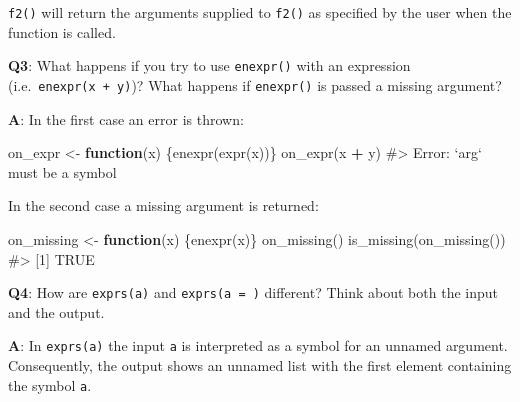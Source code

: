 \documentclass[
]{krantz}
\makeatletter
\newenvironment{Shaded}{\begin{snugshade}}{\end{snugshade}}
\newcommand{\CommentTok}[1]{\textcolor[rgb]{0.56,0.35,0.01}{\textit{#1}}}
\newcommand{\ControlFlowTok}[1]{\textcolor[rgb]{0.13,0.29,0.53}{\textbf{#1}}}
\newcommand{\KeywordTok}[1]{\textcolor[rgb]{0.13,0.29,0.53}{\textbf{#1}}}
\newcommand{\NormalTok}[1]{#1}
\newcommand{\OperatorTok}[1]{\textcolor[rgb]{0.81,0.36,0.00}{\textbf{#1}}}
\newcommand{\StringTok}[1]{\textcolor[rgb]{0.31,0.60,0.02}{#1}}
\newenvironment{kframe}{%
\medskip{}
\setlength{\fboxsep}{.8em}
 \def\at@end@of@kframe{}%
 \ifinner\ifhmode%
  \def\at@end@of@kframe{\end{minipage}}%
  \begin{minipage}{\columnwidth}%
 \fi\fi%
 \def\FrameCommand##1{\hskip\@totalleftmargin \hskip-\fboxsep
 \colorbox{shadecolor}{##1}\hskip-\fboxsep
     \hskip-\linewidth \hskip-\@totalleftmargin \hskip\columnwidth}%
 \MakeFramed {\advance\hsize-\width
   \@totalleftmargin\z@ \linewidth\hsize
   \@setminipage}}%
 {\par\unskip\endMakeFramed%
 \at@end@of@kframe}
\renewenvironment{Shaded}{\begin{kframe}}{\end{kframe}}
\renewcommand{\KeywordTok} [1]{\textcolor[rgb]{0.00,0.44,0.13}{{#1}}}
\renewcommand{\StringTok}  [1]{\textcolor[rgb]{0.25,0.44,0.63}{{#1}}}
\renewcommand{\CommentTok} [1]{\textcolor[rgb]{0.38,0.63,0.69}{{#1}}}
\renewcommand{\NormalTok}  [1]{{#1}}
\makeatother
\begin{document}
\texttt{f2()} will return the arguments supplied to \texttt{f2()} as specified by the user when the function is called.

\begin{Shaded}
\end{Shaded}

\textbf{{Q3}}: What happens if you try to use \texttt{enexpr()} with an expression (i.e.~\texttt{enexpr(x\ +\ y)})? What happens if \texttt{enexpr()} is passed a missing argument?

\textbf{{A}}: In the first case an error is thrown:

\begin{Shaded}
\begin{Highlighting}[]
\NormalTok{on_expr <-}\StringTok{ }\ControlFlowTok{function}\NormalTok{(x) \{}\KeywordTok{enexpr}\NormalTok{(}\KeywordTok{expr}\NormalTok{(x))\}}
\KeywordTok{on_expr}\NormalTok{(x }\OperatorTok{+}\StringTok{ }\NormalTok{y)}
\CommentTok{#> Error: `arg` must be a symbol}
\end{Highlighting}
\end{Shaded}

In the second case a missing argument is returned:

\begin{Shaded}
\begin{Highlighting}[]
\NormalTok{on_missing <-}\StringTok{ }\ControlFlowTok{function}\NormalTok{(x) \{}\KeywordTok{enexpr}\NormalTok{(x)\}}
\KeywordTok{on_missing}\NormalTok{()}
\KeywordTok{is_missing}\NormalTok{(}\KeywordTok{on_missing}\NormalTok{())}
\CommentTok{#> [1] TRUE}
\end{Highlighting}
\end{Shaded}

\textbf{{Q4}}: How are \texttt{exprs(a)} and \texttt{exprs(a\ =\ )} different? Think about both the input and the output.

\textbf{{A}}: In \texttt{exprs(a)} the input \texttt{a} is interpreted as a symbol for an unnamed argument. Consequently, the output shows an unnamed list with the first element containing the symbol \texttt{a}.

\begin{Shaded}
\end{Shaded}
\end{document}
